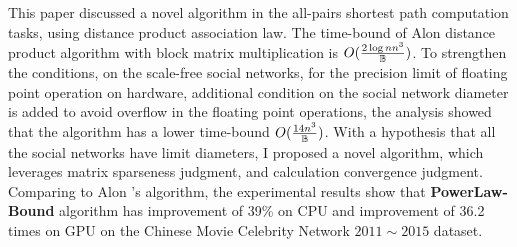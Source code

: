 \documentclass[review]{cvpr}
\begin{document}
This paper discussed a novel algorithm in the all-pairs shortest path computation tasks, using distance product association law.
The time-bound of Alon \etal distance product algorithm with block matrix multiplication is \(O({2\log{n}n^3\over \Bbb B})\).
To strengthen the conditions, on the scale-free social networks, for the precision limit of floating point operation on hardware,
additional condition on the social network diameter is added to avoid overflow in the floating point operations,
the analysis showed that the algorithm has a lower time-bound \(O({14n^3\over \Bbb B})\).
With a hypothesis that all the social networks have limit diameters, I proposed a novel algorithm,
which leverages matrix sparseness judgment, and calculation convergence judgment.
Comparing to Alon \etal's algorithm, the experimental results show that \textbf{PowerLaw-Bound} algorithm
has improvement of 39\% on CPU and improvement of 36.2 times on GPU on the Chinese Movie Celebrity Network $2011\sim2015$ dataset.
\end{document}

